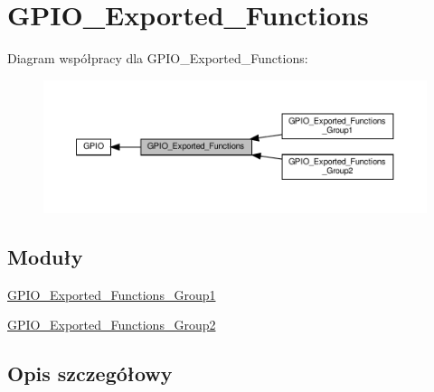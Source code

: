 \hypertarget{group___g_p_i_o___exported___functions}{}\section{G\+P\+I\+O\+\_\+\+Exported\+\_\+\+Functions}
\label{group___g_p_i_o___exported___functions}
Diagram współpracy dla G\+P\+I\+O\+\_\+\+Exported\+\_\+\+Functions\+:\nopagebreak
\begin{figure}[H]
\begin{center}
\leavevmode
\includegraphics[width=350pt]{group___g_p_i_o___exported___functions}
\end{center}
\end{figure}
\subsection*{Moduły}
\begin{DoxyCompactItemize}
\item 
\hyperlink{group___g_p_i_o___exported___functions___group1}{G\+P\+I\+O\+\_\+\+Exported\+\_\+\+Functions\+\_\+\+Group1}
\item 
\hyperlink{group___g_p_i_o___exported___functions___group2}{G\+P\+I\+O\+\_\+\+Exported\+\_\+\+Functions\+\_\+\+Group2}
\end{DoxyCompactItemize}


\subsection{Opis szczegółowy}
